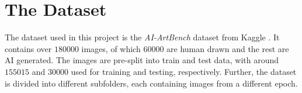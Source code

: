 \chapter{The Dataset}
\label{ch:dataset}

The dataset used in this project is the \textit{AI-ArtBench} dataset from Kaggle \cite{aiartbench}.
It contains over $180000$ images, of which $60000$ are human drawn and the rest are AI generated.
The images are pre-split into train and test data, with around $155015$ and $30000$ used for training and testing, respectively.
Further, the dataset is divided into different subfolders, each containing images from a different epoch.